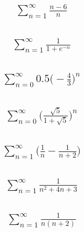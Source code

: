 \documentclass{article}
\begin{document}
\subsection{
	\begin{align*}
		\sum_{n = 1}^{\infty} \frac{n - 6}{n}
	\end{align*}
}

\subsection{
	\begin{align*}
		\sum_{n = 1}^{\infty} \frac{1}{1 + e^{-n}}
	\end{align*}
}

\subsection{
	\begin{align*}
		\sum_{n = 0}^{\infty} 0.5 \bigg( -\frac{4}{3} \bigg)^n
	\end{align*}
}

\subsection{
	\begin{align*}
		\sum_{n = 0}^{\infty} \bigg( \frac{\sqrt{5}}{1 + \sqrt{5}} \bigg)^n
	\end{align*}
}

\subsection{
	\begin{align*}
		\sum_{n = 1}^{\infty} \bigg( \frac{1}{n} - \frac{1}{n + 2} \bigg)
	\end{align*}
}

\subsection{
	\begin{align*}
		\sum_{n = 1}^{\infty} \frac{1}{n^2 + 4n + 3}
	\end{align*}
}

\subsection{
	\begin{align*}
		\sum_{n = 1}^{\infty} \frac{1}{n(n + 2)}
	\end{align*}
}
\end{document}
